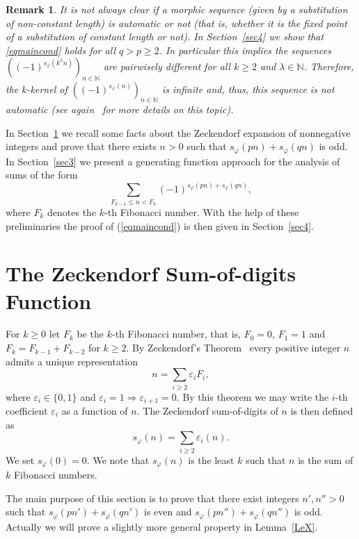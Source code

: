 \documentclass[12pt]{amsart}
\newtheorem{remark}{Remark}
\begin{document}
\begin{remark}
  It is not always clear if a morphic sequence (given by a substitution of non-constant length) is automatic or not
  (that is, whether it is  the fixed point of a substitution of constant length or not).
  In Section~\ref{sec4} we show that \eqref{eqmaincond} holds for all $q>p\geq 2$.
  In particular this implies the sequences $((-1)^{s_{\varphi}(k^{\lambda} n)})_{n\in \mathbb{N}}$
   are pairwisely different for all $k\geq 2$ and $\lambda \in \mathbb{N}$.
  Therefore, the $k$-kernel of $((-1)^{s_{\varphi}(n)})_{n\in\mathbb{N}}$ is infinite and, thus,  this sequence is not automatic 
  (see again~\cite{AS2003} for more details on this topic).
\end{remark}

In Section~\ref{sec2} we recall some facts about the Zeckendorf expansion of nonnegative integers and prove that there exists $n>0$
such that $s_\varphi(pn)+s_\varphi(qn)$ is odd.
In Section~\ref{sec3} we present a generating function approach for the analysis of sums of the form
\[ \sum_{F_{k-1}\le n< F_k} (-1)^{s_\varphi(pn)+s_\varphi(qn)}, \]
where $F_k$ denotes the $k$-th Fibonacci number.
With the help of these preliminaries the proof of (\ref{eqmaincond}) is then given in Section~\ref{sec4}.

\section{The Zeckendorf Sum-of-digits Function}\label{sec2}

For $k\geq 0$ let $F_k$ be the $k$-th Fibonacci number, that is,
$F_0=0$, $F_1=1$ and $F_k=F_{k-1}+F_{k-2}$ for $k\geq 2$.
By Zeckendorf's Theorem~\cite{Zeckendorf1972} every positive integer $n$ admits a unique representation
\[
n=\sum_{i\geq 2}\varepsilon_i F_i
,
\]
where $\varepsilon_i\in \{0,1\}$ and $\varepsilon_i=1\Rightarrow \varepsilon_{i+1}=0$.
By this theorem we may write the $i$-th coefficient $\varepsilon_i$ as a function of $n$.
The Zeckendorf sum-of-digits of $n$ is then defined as
\[
  s_\varphi(n) = \sum_{i\geq 2}\varepsilon_i(n).
\]
We set $s_\varphi(0)=0$.
We note that $s_\varphi(n)$ is the least $k$ such that $n$ is the sum of $k$ Fibonacci numbers.

The main purpose of this section is to prove that there exist integers $n',n''>0$ such that $s_\varphi(pn')+s_\varphi(qn')$ is even and $s_\varphi(pn'')+s_\varphi(qn'')$ is odd.
Actually we will prove a slightly more general property in Lemma~\ref{LeX}.
\end{document}

